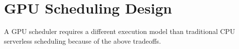 \section{GPU Scheduling Design}
\vspace*{\subsecspace}
\label{sec:design}

A GPU scheduler requires a different execution model than traditional CPU serverless scheduling because of the above tradeoffs. 

